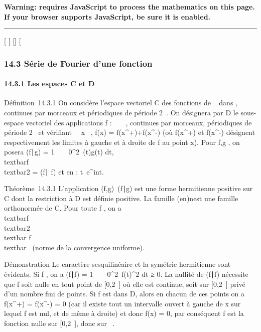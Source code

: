\textbf{Warning: 
requires JavaScript to process the mathematics on this page.\\ If your
browser supports JavaScript, be sure it is enabled.}

\begin{center}\rule{3in}{0.4pt}\end{center}

{[}
{[}
{[}{]}
{[}

\subsubsection{14.3 Série de Fourier d'une fonction}

\paragraph{14.3.1 Les espaces C et D}

Définition~14.3.1 On considère l'espace vectoriel C des fonctions de ~
dans , continues par morceaux et périodiques de période 2\pi~. On
désignera par D le sous-espace vectoriel des applications f : ~ \rightarrow~ ,
continues par morceaux, périodiques de période 2\pi~ et vérifiant
\forall~~x \in {}~, f(x) =
f(x^+)+f(x^-)  (où
f(x^+) et f(x^-) désignent respectivement les
limites à gauche et à droite de f au point x). Pour f,g \inC, on posera
(f∣g) = 1 \pi~
\int ~
0^2\pi~\overlinef(t)g(t) dt,
\\textbar{}f\\textbar{}2 =
\sqrt(f∣ f) et
en : t\mapsto~e^int.

Théorème~14.3.1 L'application
(f,g)\mapsto~(f\mathrel∣g) est
une forme hermitienne positive sur C dont la restriction à D est définie
positive. La famille (en)n est une famille
orthonormée de C. Pour toute f \inC, on a
\\textbar{}f\\textbar{}2
\leq\\textbar{} f\\textbar{}\infty~
(norme de la convergence uniforme).

Démonstration Le caractère sesquilinéaire et la symétrie hermitienne
sont évidents. Si f \inC, on a (f∣f) = 1
\pi~ \int ~
0^2\pi~\textbar{}f(t)\textbar{}^2 dt ≥ 0. La
nullité de (f∣f) nécessite que f soit nulle
en tout point de {[}0,2\pi~{]} où elle est continue, soit sur {[}0,2\pi~{]}
privé d'un nombre fini de points. Si f est dans D, alors en chacun de
ces points on a f(x^+) = f(x^-) = 0 (car il existe
tout un intervalle ouvert à gauche de x sur lequel f est nul, et de même
à droite) et donc f(x) = 0, par conséquent f est la fonction nulle sur
{[}0,2\pi~{]}, donc sur ~.

